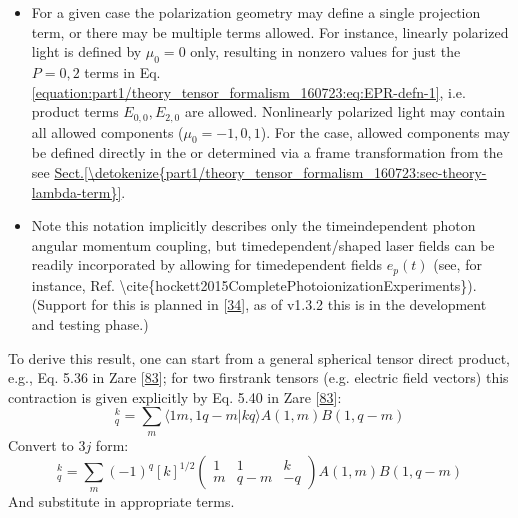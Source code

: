 \documentclass[letterpaper,table,10pt,english]{jupyterBook}
\begin{document}
\begin{itemize}
\item {} 
\sphinxAtStartPar
For a given case the polarization geometry may define a single projection term, or there may be multiple terms allowed. For instance, linearly polarized light is defined by \(\mu_0=0\) only, resulting in non\sphinxhyphen{}zero values for just the \(P=0,2\) terms in Eq. \eqref{equation:part1/theory_tensor_formalism_160723:eq:EPR-defn-1}, i.e. product terms \(E_{0,0}, E_{2,0}\) are allowed. Non\sphinxhyphen{}linearly polarized light may contain all allowed components (\(\mu_0=-1,0,1\)). For the {\hyperref[\detokenize{backmatter/glossary:term-MF}]{}} case, allowed components may be defined directly in the {\hyperref[\detokenize{backmatter/glossary:term-MF}]{}} or determined via a frame transformation from the {\hyperref[\detokenize{backmatter/glossary:term-LF}]{}} \sphinxhyphen{} see \hyperref[\detokenize{part1/theory_tensor_formalism_160723:sec-theory-lambda-term}]{Sect.\@ \ref{\detokenize{part1/theory_tensor_formalism_160723:sec-theory-lambda-term}}}.

\item {} 
\sphinxAtStartPar
Note this notation implicitly describes only the time\sphinxhyphen{}independent photon angular momentum coupling, but time\sphinxhyphen{}dependent/shaped laser fields can be readily incorporated by allowing for time\sphinxhyphen{}dependent fields \(e_{p}(t)\) (see, for instance, Ref. \textbackslash{}cite\{hockett2015CompletePhotoionizationExperiments\}). (Support for this is planned in  {[}\hyperlink{cite.backmatter/bibliography:id607}{34}{]}, as of v1.3.2 this is in the development and testing phase.)

\end{itemize}

\sphinxAtStartPar
To derive this result, one can start from a general spherical tensor direct product, e.g., Eq. 5.36 in Zare {[}\hyperlink{cite.backmatter/bibliography:id988}{83}{]}; for two first\sphinxhyphen{}rank tensors (e.g. electric field vectors) this contraction is given explicitly by Eq. 5.40 in Zare {[}\hyperlink{cite.backmatter/bibliography:id988}{83}{]}:
\label{equation:part1/theory_tensor_formalism_160723:aa810e4a-085c-4395-875e-93e09a0c9ccd}\begin{equation}
[A^{(1)}\otimes B^{(1)}]_{q}^{k}=\sum_{m}\langle1m,1q-m|kq\rangle A(1,m)B(1,q-m)
\end{equation}
\sphinxAtStartPar
Convert to \(3j\) form:
\label{equation:part1/theory_tensor_formalism_160723:ebda3fec-1ff6-4ccf-bc2e-aec0e1184d55}\begin{equation}
[A^{(1)}\otimes B^{(1)}]_{q}^{k}=\sum_{m}(-1)^{q}[k]^{1/2}\left(\begin{array}{ccc}
1 & 1 & k\\
m & q-m & -q
\end{array}\right)A(1,m)B(1,q-m)
\end{equation}
\sphinxAtStartPar
And substitute in appropriate terms.
\end{document}
